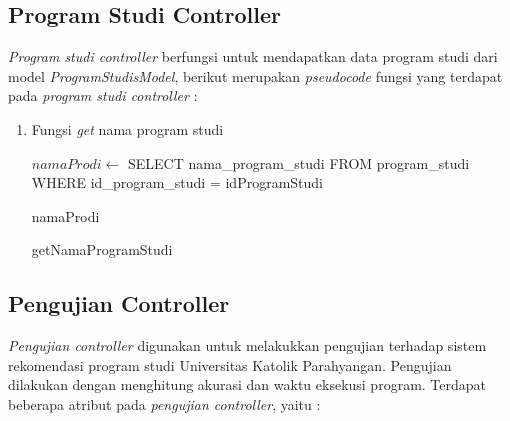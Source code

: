 \subsection{Program Studi Controller}
\label{subsec:prodicontroller}

\textit{Program studi controller} berfungsi untuk mendapatkan data program studi dari model \textit{ProgramStudisModel}, berikut merupakan \textit{pseudocode} fungsi yang terdapat pada \textit{program studi controller} :

\begin{enumerate}
    \item Fungsi \textit{get} nama program studi \\
        
        \begin{algorithm}[H]
            \begin{algorithmic}[1]
                    \State $namaProdi \gets$ SELECT nama\_program\_studi FROM program\_studi WHERE id\_program\_studi = idProgramStudi
                    
                    \State \Return namaProdi
                \EndProcedure
            \end{algorithmic} 
            \caption{getNamaProgramStudi}
            \label{alg:getNamaProgramStudi}
        \end{algorithm}
        
\end{enumerate}



\subsection{Pengujian Controller}
\label{subsec:pengujian controller}

\textit{Pengujian controller} digunakan untuk melakukkan pengujian terhadap sistem rekomendasi program studi Universitas Katolik Parahyangan. Pengujian dilakukan dengan menghitung akurasi dan waktu eksekusi program. Terdapat beberapa atribut pada \textit{pengujian controller}, yaitu :

